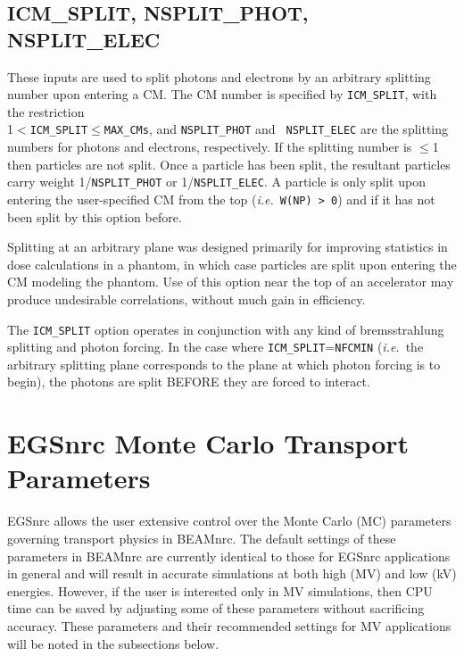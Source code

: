 \documentclass[12pt,twoside]{article}
\newcommand{\ie}{{\em i.e.}}
\begin{document}
\subsection{ ICM\_SPLIT, NSPLIT\_PHOT, NSPLIT\_ELEC}
\label{icmsplit}

These inputs are used to split photons and electrons by an arbitrary splitting
number upon entering a CM.  The CM number is specified by {\tt ICM\_SPLIT}, with
the restriction\\
1$<${\tt ICM\_SPLIT}$\leq${\tt MAX\_CMs}, and {\tt NSPLIT\_PHOT} and {\tt
NSPLIT\_ELEC} are the splitting numbers for photons and electrons, respectively.
If the splitting number is $\leq$1 then particles are not split. Once a particle
has been split, the resultant particles carry weight 1/{\tt NSPLIT\_PHOT} or
1/{\tt NSPLIT\_ELEC}.  A particle is only split upon entering the user-specified
CM from the top (\ie\ {\tt W(NP) > 0}) and if it has not been split by this
option before.

Splitting at an
arbitrary plane was designed primarily for improving statistics in
dose calculations in a phantom,
in which case particles are split upon entering the CM modeling
the phantom.  Use of this option near the
top of an accelerator may produce undesirable correlations, without much
gain in efficiency.

The {\tt ICM\_SPLIT} option operates in conjunction with any kind of
bremsstrahlung splitting and photon forcing.  In the case where
{\tt ICM\_SPLIT}={\tt NFCMIN} (\ie\ the arbitrary splitting plane corresponds
to the plane at which photon forcing is to begin), the photons are split
BEFORE they are forced to interact.

\section{EGSnrc Monte Carlo Transport Parameters}
\label{egsnrc_inputs}

EGSnrc allows the user extensive control over the Monte Carlo (MC) parameters
governing transport physics in BEAMnrc.  The default settings of these
parameters in BEAMnrc are currently identical to those for EGSnrc applications
in general and will result in accurate simulations at both high (MV) and low
(kV) energies. However, if the user is interested only in MV simulations, then
CPU time can be saved by adjusting some of these parameters without sacrificing
accuracy.  These parameters and their recommended settings for MV applications
will be noted in the subsections below.
\end{document}
